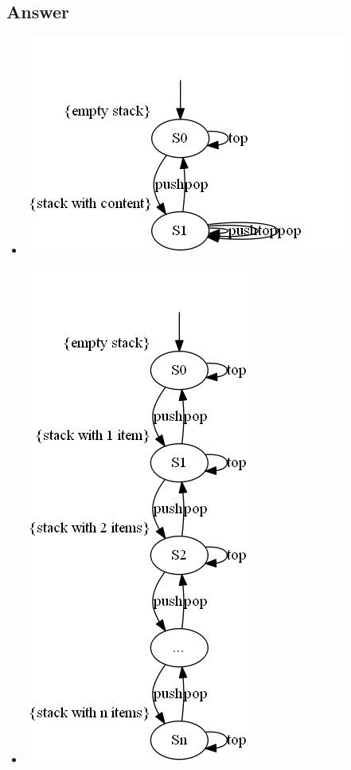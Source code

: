 \documentclass[12pt]{article}
\begin{document}
\subsection*{Answer}
\begin{itemize}
	\item \begin{centering}
		\includegraphics*[scale=0.7]{26a.png}
	\end{centering}
	\item \begin{centering}
		\includegraphics*[scale=0.55]{26b.png}
	\end{centering}
\end{itemize}
\end{document}
